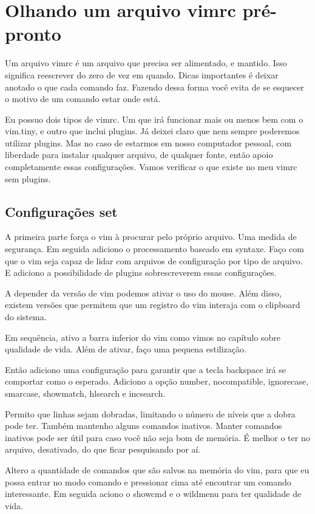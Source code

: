 \section{Olhando um arquivo vimrc pré-pronto}
Um arquivo vimrc é um arquivo que precisa ser alimentado, e mantido.
Isso significa reescrever do zero de vez em quando.
Dicas importantes é deixar anotado o que cada comando faz.
Fazendo dessa forma você evita de se esquecer o motivo de um comando estar onde está.

Eu possuo dois tipos de vimrc.
Um que irá funcionar mais ou menos bem com o vim.tiny, e outro que inclui plugins.
Já deixei claro que nem sempre poderemos utilizar plugins.
Mas no caso de estarmos em nosso computador pessoal, com liberdade para instalar qualquer arquivo,
de qualquer fonte, então apoio completamente essas configurações.
Vamos verificar o que existe no meu vimrc sem plugins.

\subsection{Configurações set}

A primeira parte força o vim à procurar pelo próprio arquivo.
Uma medida de segurança.
Em seguida adiciono o processamento baseado em syntaxe.
Faço com que o vim seja capaz de lidar com arquivos de configuração por tipo de arquivo.
E adiciono a possibilidade de plugins sobrescreverem essas configurações.

A depender da versão de vim podemos ativar o uso do mouse.
Além disso, existem versões que permitem que um registro do vim interaja com o clipboard do sistema.

Em sequência, ativo a barra inferior do vim como vimos no capítulo sobre qualidade de vida.
Além de ativar, faço uma pequena estilização.

Então adiciono uma configuração para garantir que a tecla backspace irá se comportar como o esperado.
Adiciono a opção number, nocompatible, ignorecase, smarcase, showmatch, hlsearch e incsearch.

Permito que linhas sejam dobradas, limitando o número de níveis que a dobra pode ter.
Também mantenho alguns comandos inativos.
Manter comandos inativos pode ser útil para caso você não seja bom de memória.
É melhor o ter no arquivo, desativado, do que ficar pesquisando por aí.

Altero a quantidade de comandos que são salvos na memória do vim, para que eu possa entrar no modo comando e pressionar cima até encontrar um comando interessante.
Em seguida aciono o showcmd e o wildmenu para ter qualidade de vida.

